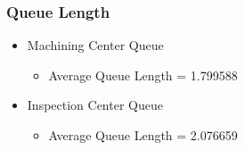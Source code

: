 \documentclass[aps,letterpaper,10pt]{revtex4}
\begin{document}
        \subsubsection{Queue Length}
            \begin{itemize}
                \item Machining Center Queue
                    \begin{itemize}
                        \item Average Queue Length = 1.799588
                    \end{itemize}
                    \begin{figure}[htp]
                        \begin{center}
                        \end{center}
                    \end{figure}
                \item Inspection Center Queue
                    \begin{itemize}
                        \item Average Queue Length = 2.076659
                    \end{itemize}
                    \begin{figure}[htp]
                        \begin{center}
\end{center}
\end{figure}
\end{itemize}
\end{document}
